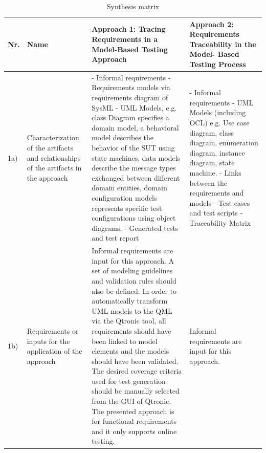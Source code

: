 \newpage
{}
\begin{landscape} 
\begin{small}
\begin{longtable}{ p{0.5cm} | p{2.5cm} | p{9cm} | p{9cm} }
\caption{Synthesis matrix}
\label{tab:TSM}
\\    %
\hline
\textbf{Nr.} & \textbf{Name} & \textbf{Approach 1: Tracing Requirements in a Model-Based Testing Approach}  & \textbf{Approach 2: Requirements Traceability in the Model- Based Testing Process} \\
\hline
1a) & Characterization of the artifacts and relationships of the artifacts in the approach& - Informal requirements
\newline - Requirements models via requirements diagram of SysML
\newline - UML Models, e.g. class Diagram specifies a domain model, a behavioral model describes the behavior of the SUT using state machines, data models describe the message types exchanged between different domain entities, domain configuration models represents specific test configurations using object diagrams.
\newline - Generated tests and test report
 & - Informal requirements
\newline - UML Models (including OCL) e.g. Use case diagram, class diagram, enumeration diagram, instance diagram, state machine.
\newline - Links between the requirements and models
\newline - Test cases and test scripts
\newline - Traceability Matrix \\
\hline
1b) & Requirements or inputs for the application of the approach & Informal requirements are input for this approach.
\newline A set of modeling guidelines and validation rules should also be defined.
\newline In order to automatically transform UML models to the QML via the Qtronic tool, all requirements should have been linked to model elements and the models should have been validated.
\newline The desired coverage criteria used for test generation should be manually selected from the GUI of Qtronic.
\newline The presented approach is for functional requirements and it only supports online testing. & Informal requirements are input for this approach. 

\end{longtable}
\end{small}
\end{landscape}
